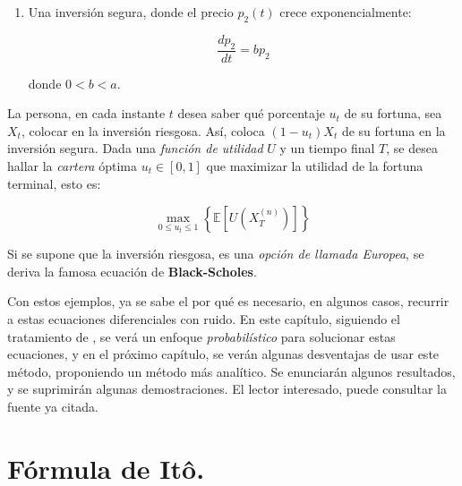 \begin{enumerate}
\begin{enumerate}
		\item Una inversión segura, donde el precio $p_2 (t)$ crece exponencialmente:

		\[
			\frac{dp_2}{dt} = bp_2	
		\]

		donde $0 < b < a$.

	\end{enumerate}

	La persona, en cada instante $t$ desea saber qué porcentaje $u_t$ de su fortuna, sea $X_t$, colocar en la inversión riesgosa. Así, coloca $(1 - u_t)X_t$ de su fortuna en la inversión segura. Dada una \textit{función de utilidad} $U$ y un tiempo final $T$, se desea hallar la \textit{cartera} óptima $u_t \in [0, 1]$ que maximizar la utilidad de la fortuna terminal, esto es:

	\[
		\max_{0 \leq u_t \leq 1} \left\{  \mathbb{E}[ U(X_T^{(n)}) ] \right\}
	\]

	Si se supone que la inversión riesgosa, es una \textit{opción de llamada Europea}, se deriva la famosa ecuación de \textbf{Black-Scholes}.


\end{enumerate}


Con estos ejemplos, ya se sabe el por qué es necesario, en algunos casos, recurrir a estas ecuaciones diferenciales con ruido. En este capítulo, siguiendo el tratamiento de \cite{EDE_Oksendal}, se verá un enfoque \textit{probabilístico} para solucionar estas ecuaciones, y en el próximo capítulo, se verán algunas desventajas de usar este método, proponiendo un método más analítico. Se enunciarán algunos resultados, y se suprimirán algunas demostraciones. El lector interesado, puede consultar la fuente ya citada.


















\section{Fórmula de Itô.}

